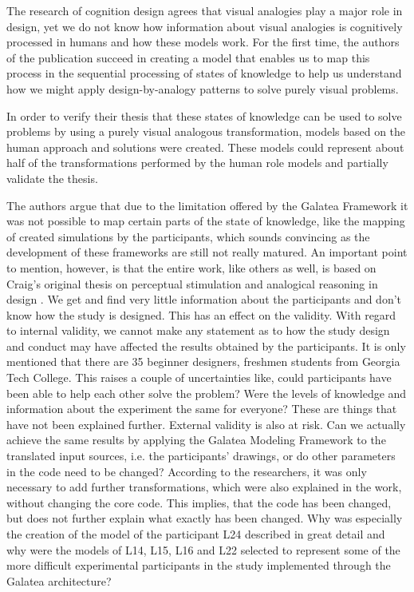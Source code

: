 \documentclass[12pt]{article}
\begin{document}
The research of cognition design agrees that visual analogies play a major role in design, yet we do not know how information about visual analogies is cognitively processed in humans and how these models work. For the first time, the authors of the publication succeed in creating a model that enables us to map this process in the sequential processing of states of knowledge to help us understand how we might apply design-by-analogy patterns to solve purely visual problems. 

In order to verify their thesis that these states of knowledge can be used to solve problems by using a purely visual analogous transformation, models based on the human approach and solutions were created. These models could represent about half of the transformations performed by the human role models and partially validate the thesis. 

The authors argue that due to the limitation offered by the Galatea Framework it was not possible to map certain parts of the state of knowledge, like the mapping of created simulations by the participants, which sounds convincing as the development of these frameworks are still not really matured. An important point to mention, however, is that the entire work, like others as well, is based on Craig's original thesis on perceptual stimulation and analogical reasoning in design \cite{craig2001perceptual}. We get and find very little information about the participants and don't know how the study is designed. This has an effect on the validity. With regard to internal validity, we cannot make any statement as to how the study design and conduct may have affected the results obtained by the participants. It is only mentioned that there are 35 beginner designers, freshmen students from Georgia Tech College. This raises a couple of uncertainties like, could participants have been able to help each other solve the problem? Were the levels of knowledge and information about the experiment the same for everyone? These are things that have not been explained further. External validity is also at risk. Can we actually achieve the same results by applying the Galatea Modeling Framework to the translated input sources, i.e. the participants' drawings, or do other parameters in the code need to be changed? According to the researchers, it was only necessary to add further transformations, which were also explained in the work, without changing the core code. This implies, that the code has been changed, but does not further explain what exactly has been changed. Why was especially the creation of the model of the participant L24 described in great detail and why were the models of L14, L15, L16 and L22 selected to represent some of the more difficult experimental participants in the study implemented through the Galatea architecture? 
\end{document}
